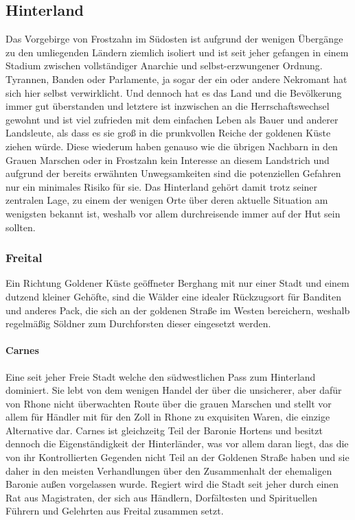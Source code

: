 \documentclass[a4paper,12pt,oneside]{book}
\begin{document}
\subsection{Hinterland}
Das Vorgebirge von Frostzahn im Südosten ist aufgrund der wenigen Übergänge zu den umliegenden Ländern ziemlich isoliert und ist seit jeher gefangen in einem Stadium zwischen vollständiger Anarchie und selbst-erzwungener Ordnung. Tyrannen, Banden oder Parlamente, ja sogar der ein oder andere Nekromant hat sich hier selbst verwirklicht. Und dennoch hat es das Land und die Bevölkerung immer gut überstanden und letztere ist inzwischen an die Herrschaftswechsel gewohnt und ist viel zufrieden mit dem einfachen Leben als Bauer und anderer Landsleute, als dass es sie groß in die prunkvollen Reiche der goldenen Küste ziehen würde. Diese wiederum haben genauso wie die übrigen Nachbarn in den Grauen Marschen oder in Frostzahn kein Interesse an diesem Landstrich und aufgrund der bereits erwähnten Unwegsamkeiten sind die potenziellen Gefahren nur ein minimales Risiko für sie. Das Hinterland gehört damit trotz seiner zentralen Lage, zu einem der wenigen Orte über deren aktuelle Situation am wenigsten bekannt ist, weshalb vor allem durchreisende immer auf der Hut sein sollten.
\subsubsection{Freital}
Ein Richtung Goldener Küste geöffneter Berghang mit nur einer Stadt und einem dutzend kleiner Gehöfte, sind die Wälder eine idealer Rückzugsort für Banditen und anderes Pack, die sich an der goldenen Straße im Westen bereichern, weshalb regelmäßig Söldner zum Durchforsten dieser eingesetzt werden. 
\paragraph{Carnes}
Eine seit jeher Freie Stadt welche den südwestlichen Pass zum Hinterland dominiert. Sie lebt von dem wenigen Handel der über die unsicherer, aber dafür von Rhone nicht überwachten Route über die grauen Marschen und stellt vor allem für Händler mit für den Zoll in Rhone zu exquisiten Waren, die einzige Alternative dar. Carnes ist gleichzeitg Teil der Baronie Hortens und besitzt dennoch die Eigenständigkeit der Hinterländer, was vor allem daran liegt, das die von ihr Kontrollierten Gegenden nicht Teil an der Goldenen Straße haben und sie daher in den meisten Verhandlungen über den Zusammenhalt der ehemaligen Baronie außen vorgelassen wurde. Regiert wird die Stadt seit jeher durch einen Rat aus Magistraten, der sich aus Händlern, Dorfältesten und Spirituellen Führern und Gelehrten aus Freital zusammen setzt.
\end{document}
